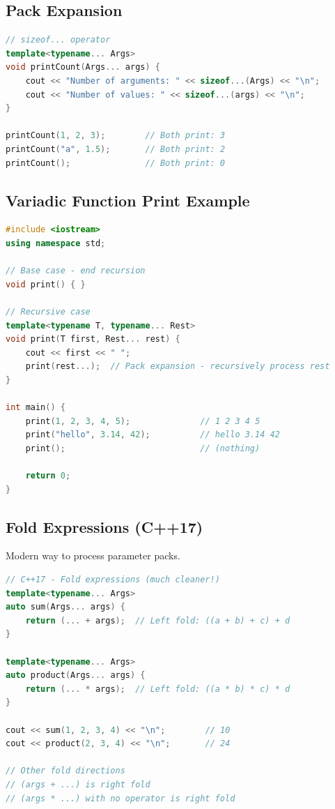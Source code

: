 \hypertarget{pack-expansion}{%
\subsection{Pack Expansion}\label{pack-expansion}}

\begin{lstlisting}[language={C++}]
// sizeof... operator
template<typename... Args>
void printCount(Args... args) {
    cout << "Number of arguments: " << sizeof...(Args) << "\n";
    cout << "Number of values: " << sizeof...(args) << "\n";
}

printCount(1, 2, 3);        // Both print: 3
printCount("a", 1.5);       // Both print: 2
printCount();               // Both print: 0
\end{lstlisting}

\hypertarget{variadic-function-print-example}{%
\subsection{Variadic Function Print
Example}\label{variadic-function-print-example}}

\begin{lstlisting}[language={C++}]
#include <iostream>
using namespace std;

// Base case - end recursion
void print() { }

// Recursive case
template<typename T, typename... Rest>
void print(T first, Rest... rest) {
    cout << first << " ";
    print(rest...);  // Pack expansion - recursively process rest
}

int main() {
    print(1, 2, 3, 4, 5);              // 1 2 3 4 5
    print("hello", 3.14, 42);          // hello 3.14 42
    print();                           // (nothing)

    return 0;
}
\end{lstlisting}

\hypertarget{fold-expressions-c17}{%
\subsection{Fold Expressions (C++17)}\label{fold-expressions-c17}}

Modern way to process parameter packs.

\begin{lstlisting}[language={C++}]
// C++17 - Fold expressions (much cleaner!)
template<typename... Args>
auto sum(Args... args) {
    return (... + args);  // Left fold: ((a + b) + c) + d
}

template<typename... Args>
auto product(Args... args) {
    return (... * args);  // Left fold: ((a * b) * c) * d
}

cout << sum(1, 2, 3, 4) << "\n";        // 10
cout << product(2, 3, 4) << "\n";       // 24

// Other fold directions
// (args + ...) is right fold
// (args * ...) with no operator is right fold
\end{lstlisting}

